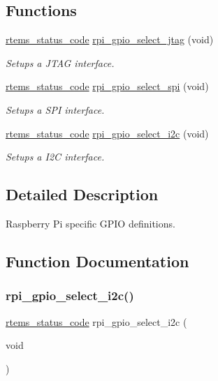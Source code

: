 \subsection*{Functions}
\begin{DoxyCompactItemize}
\item 
\mbox{\hyperlink{group__ClassicStatus_ga545d41846817eaba6143d52ee4d9e9fe}{rtems\+\_\+status\+\_\+code}} \mbox{\hyperlink{rpi-gpio_8h_ab31aee23a17b307e47076c1877f5736e}{rpi\+\_\+gpio\+\_\+select\+\_\+jtag}} (void)
\begin{DoxyCompactList}\small\item\em Setups a J\+T\+AG interface. \end{DoxyCompactList}\item 
\mbox{\hyperlink{group__ClassicStatus_ga545d41846817eaba6143d52ee4d9e9fe}{rtems\+\_\+status\+\_\+code}} \mbox{\hyperlink{rpi-gpio_8h_a2546c0dc5eb7c840fe712e9ac748e6a9}{rpi\+\_\+gpio\+\_\+select\+\_\+spi}} (void)
\begin{DoxyCompactList}\small\item\em Setups a S\+PI interface. \end{DoxyCompactList}\item 
\mbox{\hyperlink{group__ClassicStatus_ga545d41846817eaba6143d52ee4d9e9fe}{rtems\+\_\+status\+\_\+code}} \mbox{\hyperlink{rpi-gpio_8h_adf19e397f4bfdb38d6d75a604e7373d1}{rpi\+\_\+gpio\+\_\+select\+\_\+i2c}} (void)
\begin{DoxyCompactList}\small\item\em Setups a I2C interface. \end{DoxyCompactList}\end{DoxyCompactItemize}


\subsection{Detailed Description}
Raspberry Pi specific G\+P\+IO definitions. 



\subsection{Function Documentation}
\mbox{\label{rpi-gpio_8h_adf19e397f4bfdb38d6d75a604e7373d1}} 
\subsubsection{\texorpdfstring{rpi\_gpio\_select\_i2c()}{rpi\_gpio\_select\_i2c()}}
{\footnotesize\ttfamily \mbox{\hyperlink{group__ClassicStatus_ga545d41846817eaba6143d52ee4d9e9fe}{rtems\+\_\+status\+\_\+code}} rpi\+\_\+gpio\+\_\+select\+\_\+i2c (\begin{DoxyParamCaption}\item[{void}]{ }\end{DoxyParamCaption})}




